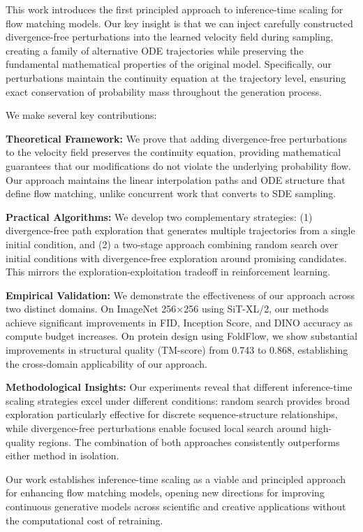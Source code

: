 \documentclass{article}
\begin{document}
This work introduces the first principled approach to inference-time scaling for flow matching models. Our key insight is that we can inject carefully constructed divergence-free perturbations into the learned velocity field during sampling, creating a family of alternative ODE trajectories while preserving the fundamental mathematical properties of the original model. Specifically, our perturbations maintain the continuity equation at the trajectory level, ensuring exact conservation of probability mass throughout the generation process.

We make several key contributions:

\textbf{Theoretical Framework:} We prove that adding divergence-free perturbations to the velocity field preserves the continuity equation, providing mathematical guarantees that our modifications do not violate the underlying probability flow. Our approach maintains the linear interpolation paths and ODE structure that define flow matching, unlike concurrent work that converts to SDE sampling.

\textbf{Practical Algorithms:} We develop two complementary strategies: (1) divergence-free path exploration that generates multiple trajectories from a single initial condition, and (2) a two-stage approach combining random search over initial conditions with divergence-free exploration around promising candidates. This mirrors the exploration-exploitation tradeoff in reinforcement learning.

\textbf{Empirical Validation:} We demonstrate the effectiveness of our approach across two distinct domains. On ImageNet 256×256 using SiT-XL/2, our methods achieve significant improvements in FID, Inception Score, and DINO accuracy as compute budget increases. On protein design using FoldFlow, we show substantial improvements in structural quality (TM-score) from 0.743 to 0.868, establishing the cross-domain applicability of our approach.

\textbf{Methodological Insights:} Our experiments reveal that different inference-time scaling strategies excel under different conditions: random search provides broad exploration particularly effective for discrete sequence-structure relationships, while divergence-free perturbations enable focused local search around high-quality regions. The combination of both approaches consistently outperforms either method in isolation.

Our work establishes inference-time scaling as a viable and principled approach for enhancing flow matching models, opening new directions for improving continuous generative models across scientific and creative applications without the computational cost of retraining.
\end{document}
